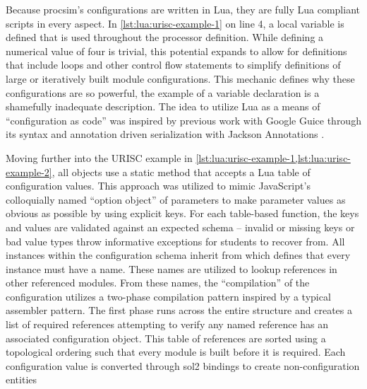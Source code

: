 Because procsim's configurations are written in Lua, they are fully Lua compliant scripts in every aspect. In \cref{lst:lua:urisc-example-1} on line 4, a local variable is defined that is used throughout the processor definition. While defining a numerical value of four is trivial, this potential expands to allow for definitions that include loops and other control flow statements to simplify definitions of large or iteratively built module configurations. This mechanic defines why these configurations are so powerful, the example of a variable declaration is a shamefully inadequate description. The idea to utilize Lua as a means of ``configuration as code'' was inspired by previous work with Google Guice through its  syntax \cite{Google:Guice:Motiviation} and annotation driven serialization with Jackson Annotations \cite{GitHub:Jackson:Annotations}.

Moving further into the URISC example in \cref{lst:lua:urisc-example-1,lst:lua:urisc-example-2}, all objects use a static  method that accepts a Lua table of configuration values. This approach was utilized to mimic JavaScript's colloquially named ``option object'' of parameters to make parameter values as obvious as possible by using explicit keys. For each table-based function, the keys and values are validated against an expected schema -- invalid or missing keys or bad value types throw informative exceptions for students to recover from. All instances within the configuration schema inherit from  which defines that every instance must have a name. These names are utilized to lookup references in other referenced modules. From these names, the ``compilation'' of the configuration utilizes a two-phase compilation pattern inspired by a typical assembler pattern. The first phase runs across the entire structure and creates a list of required references attempting to verify any named reference has an associated configuration object. This table of references are sorted using a topological ordering such that every module is built before it is required. Each configuration value is converted through sol2 bindings to create non-configuration entities 

